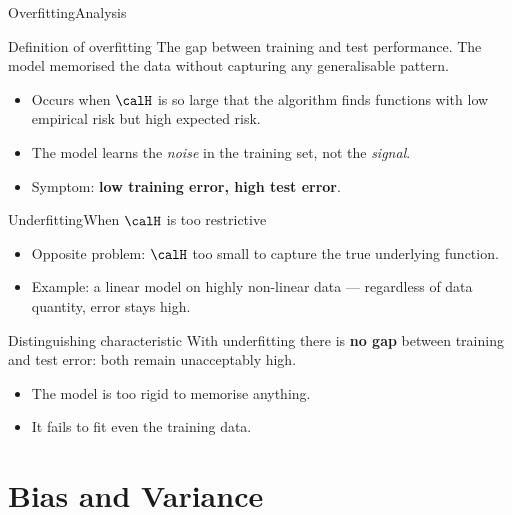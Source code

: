 \begin{frame}{Overfitting}{Analysis}
  \begin{alertblock}{Definition of overfitting}
    The gap between training and test performance. The model memorised the data without
    capturing any generalisable pattern.
  \end{alertblock}
  \bigskip
  \begin{itemize}
    \item Occurs when $\calH$ is so large that the algorithm finds functions with low
          empirical risk but high expected risk.
    \item The model learns the \emph{noise} in the training set, not the \emph{signal}.
    \item Symptom: \textbf{low training error, high test error}.
  \end{itemize}
\end{frame}

\begin{frame}{Underfitting}{When $\calH$ is too restrictive}
  \begin{itemize}
    \item Opposite problem: $\calH$ too small to capture the true underlying function.
    \item Example: a linear model on highly non-linear data — regardless of data quantity,
          error stays high.
  \end{itemize}
  \bigskip
  \begin{block}{Distinguishing characteristic}
    With underfitting there is \textbf{no gap} between training and test error: both remain
    unacceptably high.
    \begin{itemize}
      \item The model is too rigid to memorise anything.
      \item It fails to fit even the training data.
    \end{itemize}
  \end{block}
\end{frame}

\section{Bias and Variance}

